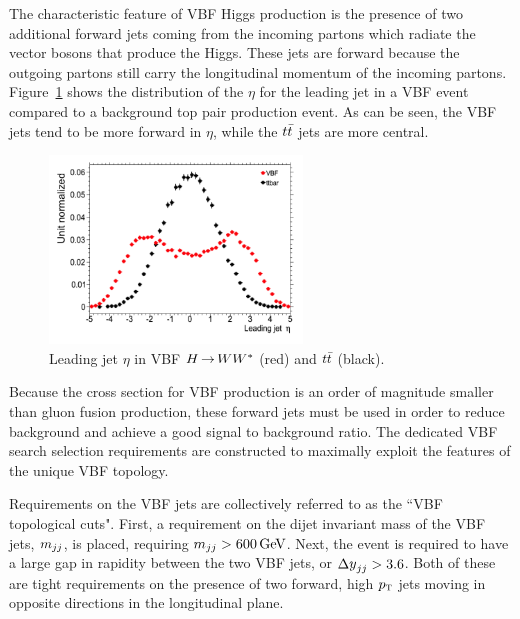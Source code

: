 The characteristic feature of VBF Higgs production is the presence of two additional forward jets coming from the incoming partons which radiate the vector bosons that produce the Higgs. These jets are forward because the outgoing partons still carry the longitudinal momentum of the incoming partons. Figure~\ref{fig:VBF_LeadJetEta} shows the distribution of the $\eta$ for the leading jet in a VBF event compared to a background top pair production event. As can be seen, the VBF jets tend to be more forward in $\eta$, while the $t\bar{t}$ jets are more central. 
%
\begin{figure}[h!]
  \vspace{20pt}
  \centering
  \captionsetup{justification=centering}
  \hspace*{-32pt}
  \includegraphics[width=0.6\textwidth]{figures/VBF_LeadJetEta}
  \caption{Leading jet $\eta$ in VBF $H{\,{\rightarrow}\,}WW^\ast$ (red) and $t\bar{t}$ (black).}
  \label{fig:VBF_LeadJetEta}
\end{figure}
%
Because the cross section for VBF production is an order of magnitude smaller than gluon fusion production, these forward jets must be used in order to reduce background and achieve a good signal to background ratio. The dedicated VBF search selection requirements are constructed to maximally exploit the features of the unique VBF topology.

Requirements on the VBF jets are collectively referred to as the ``VBF topological cuts". First, a requirement on the dijet invariant mass of the VBF jets, $m_{jj}$, is placed, requiring $\mjj > 600 \GeV$. Next, the event is required to have a large gap in rapidity between the two VBF jets, or $\dyjj > 3.6$. Both of these are tight requirements on the presence of two forward, high $p_{\textrm{\footnotesize\sc t}}$ jets moving in opposite directions in the longitudinal plane. 

